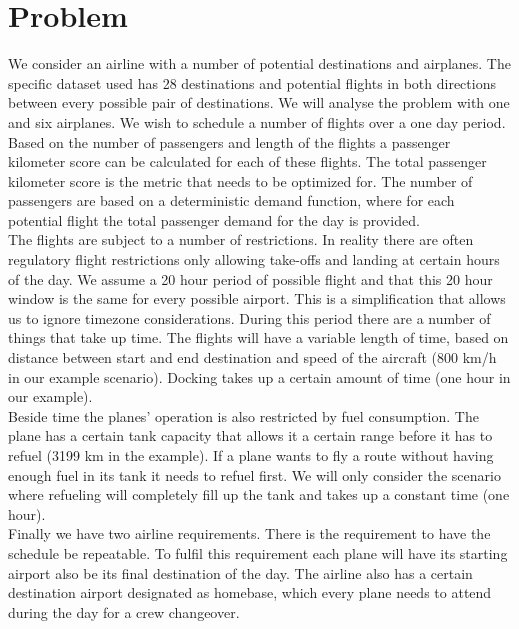 \documentclass[journal]{IEEEtran}
\begin{document}
\section{Problem}
We consider an airline with a number of potential destinations and airplanes. The specific dataset used has 28 destinations and potential flights in both directions between every possible pair of destinations. We will analyse the problem with one and six airplanes. We wish to schedule a number of flights over a one day period. Based on the number of passengers and length of the flights a passenger kilometer score can be calculated for each of these flights. The total passenger kilometer score is the metric that needs to be optimized for. The number of passengers are based on a deterministic demand function, where for each potential flight the total passenger demand for the day is provided. \\
The flights are subject to a number of restrictions. In reality there are often regulatory flight restrictions only allowing take-offs and landing at certain hours of the day. We assume a 20 hour period of possible flight and that this 20 hour window is the same for every possible airport. This is a simplification that allows us to ignore timezone considerations. During this period there are a number of things that take up time. The flights will have a variable length of time, based on distance between start and end destination and speed of the aircraft (800 km/h in our example scenario). Docking takes up a certain amount of time (one hour in our example).\\
Beside time the planes' operation is also restricted by fuel consumption. The plane has a certain tank capacity that allows it a certain range before it has to refuel (3199 km in the example). If a plane wants to fly a route without having enough fuel in its tank it needs to refuel first. We will only consider the scenario where refueling will completely fill up the tank and takes up a constant time (one hour). \\
Finally we have two airline requirements. There is the requirement to have the schedule be repeatable. To fulfil this requirement each plane will have its starting airport also be its final destination of the day. The airline also has a certain destination airport designated as homebase, which every plane needs to attend during the day for a crew changeover. 
\end{document}
